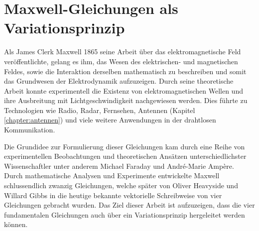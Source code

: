 %
%
%
%

\chapter{Maxwell-Gleichungen als Variationsprinzip\label{chapter:maxwell}}
\begin{refsection}
%
%
%
%

Als James Clerk Maxwell 1865 seine Arbeit über das elektromagnetische Feld veröffentlichte, gelang es ihm, das Wesen des elektrischen- und magnetischen Feldes, sowie die Interaktion derselben mathematisch zu beschreiben und somit das Grundwesen der Elektrodynamik aufzuzeigen.
%
%
%
Durch seine theoretische Arbeit konnte experimentell die Existenz von elektromagnetischen Wellen und ihre Ausbreitung mit Lichtgeschwindigkeit nachgewiesen werden.
%
Dies führte zu Technologien wie Radio, Radar, Fernsehen, Antennen (Kapitel \ref{chapter:antennen}) und viele weitere Anwendungen in der drahtlosen Kommunikation. 
%
%
%
%
%
%

Die Grundidee zur Formulierung dieser Gleichungen kam durch eine Reihe von experimentellen Beobachtungen und theoretischen Ansätzen unterschiedlichster Wissenschaftler unter anderem Michael Faraday und André-Marie Ampère.
%
%
Durch mathematische Analysen und Experimente entwickelte Maxwell schlussendlich zwanzig Gleichungen, welche später von Oliver Heavyside und Willard Gibbs in die heutige bekannte vektorielle Schreibweise von vier Gleichungen gebracht wurden.
%
%
Das Ziel dieser Arbeit ist aufzuzeigen, dass die vier fundamentalen Gleichungen  auch über ein Variationsprinzip hergeleitet werden können.









\printbibliography[heading=subbibliography]

\end{refsection}
